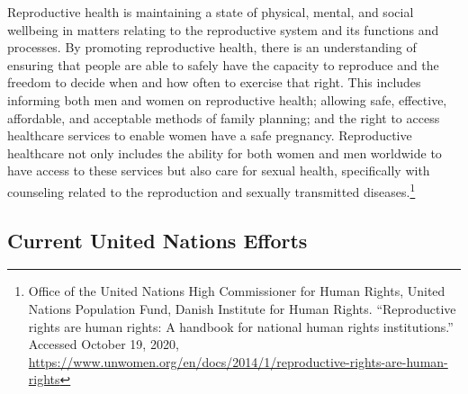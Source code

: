 \documentclass[10pt, letterpaper]{article}
\begin{document}
Reproductive health is maintaining a state of physical, mental, and
social wellbeing in matters relating to the reproductive system and its
functions and processes. By promoting reproductive health, there is an
understanding of ensuring that people are able to safely have the
capacity to reproduce and the freedom to decide when and how often to
exercise that right. This includes informing both men and women on
reproductive health; allowing safe, effective, affordable, and
acceptable methods of family planning; and the right to access
healthcare services to enable women have a safe pregnancy. Reproductive
healthcare not only includes the ability for both women and men
worldwide to have access to these services but also care for sexual
health, specifically with counseling related to the reproduction and
sexually transmitted diseases.\footnote{Office of the United Nations
  High Commissioner for Human Rights, United Nations Population Fund,
  Danish Institute for Human Rights. ``Reproductive rights are human
  rights: A handbook for national human rights institutions.'' Accessed
  October 19, 2020,
  \href{https://www.unwomen.org/en/docs/2014/1/reproductive-rights-are-human-rights}{{https://www.unwomen.org/en/docs/2014/1/reproductive-rights-are-human-rights}}} \\

\subsection{Current United Nations Efforts}
\end{document}
